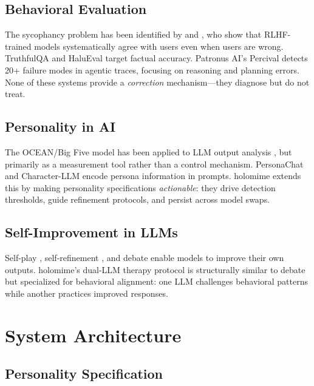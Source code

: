 \documentclass[11pt,a4paper]{article}
\begin{document}
\subsection{Behavioral Evaluation}

The sycophancy problem has been identified by \citet{perez2023discovering} and \citet{sharma2023towards}, who show that RLHF-trained models systematically agree with users even when users are wrong. TruthfulQA \citep{lin2022truthfulqa} and HaluEval \citep{li2023halueval} target factual accuracy. Patronus AI's Percival detects 20+ failure modes in agentic traces, focusing on reasoning and planning errors. None of these systems provide a \emph{correction} mechanism---they diagnose but do not treat.

\subsection{Personality in AI}

The OCEAN/Big Five model \citep{costa1992revised} has been applied to LLM output analysis \citep{jiang2023evaluating,safdari2023personality}, but primarily as a measurement tool rather than a control mechanism. PersonaChat \citep{zhang2018personalizing} and Character-LLM \citep{shao2023character} encode persona information in prompts. holomime extends this by making personality specifications \emph{actionable}: they drive detection thresholds, guide refinement protocols, and persist across model swaps.

\subsection{Self-Improvement in LLMs}

Self-play \citep{burns2023weaktostrong}, self-refinement \citep{madaan2023selfrefine}, and debate \citep{irving2018ai} enable models to improve their own outputs. holomime's dual-LLM therapy protocol is structurally similar to debate but specialized for behavioral alignment: one LLM challenges behavioral patterns while another practices improved responses.

\section{System Architecture}

\subsection{Personality Specification}
\end{document}
